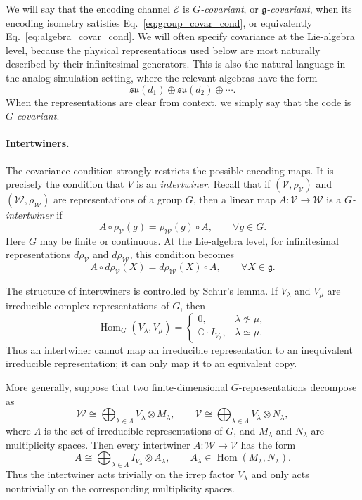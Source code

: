 \documentclass[10pt,twocolumn,superscriptaddress,aps,amsmath,amssymb,citeautoscript,floatfix,prx]{revtex4-2}
\newcounter{alg}
\theoremstyle{plain}
\theoremstyle{plain}
\theoremstyle{plain}
\theoremstyle{plain}
\theoremstyle{plain}
\theoremstyle{plain}
\begin{document}
We will say that the encoding channel $\mathcal E$ is \textit{$G$-covariant}, or \textit{$\mathfrak g$-covariant}, when its encoding isometry satisfies Eq.~\eqref{eq:group_covar_cond}, or equivalently Eq.~\eqref{eq:algebra_covar_cond}. We will often specify covariance at the Lie-algebra level, because the physical representations used below are most naturally described by their infinitesimal generators. This is also the natural language in the analog-simulation setting, where the relevant algebras have the form
$$
\mathfrak{su}(d_1)
\oplus
\mathfrak{su}(d_2)
\oplus
\cdots .
$$
When the representations are clear from context, we simply say that the code is \textit{$G$-covariant}.

\paragraph{Intertwiners.}

The covariance condition strongly restricts the possible encoding maps. It is precisely the condition that $V$ is an \textit{intertwiner}. Recall that if $(\mathcal V,\rho_{\mathcal V})$ and $(\mathcal W,\rho_{\mathcal W})$ are representations of a group $G$, then a linear map $A:\mathcal V\to\mathcal W$ is a \textit{$G$-intertwiner} if
\begin{equation}\label{eq:intertwiner_def}
A\circ\rho_{\mathcal V}(g)
=
\rho_{\mathcal W}(g)\circ A,
\qquad
\forall g\in G .
\end{equation}
Here $G$ may be finite or continuous. At the Lie-algebra level, for infinitesimal representations $d\rho_{\mathcal V}$ and $d\rho_{\mathcal W}$, this condition becomes
$$
A\circ d\rho_{\mathcal V}(X)
=
d\rho_{\mathcal W}(X)\circ A,
\qquad
\forall X\in\mathfrak g .
$$

The structure of intertwiners is controlled by Schur's lemma. If $V_\lambda$ and $V_\mu$ are irreducible complex representations of $G$, then
$$
\operatorname{Hom}_G(V_\lambda,V_\mu)
=
\begin{cases}
0, & \lambda\not\simeq\mu,\\
\mathbb C\cdot I_{V_\lambda}, & \lambda\simeq\mu .
\end{cases}
$$
Thus an intertwiner cannot map an irreducible representation to an inequivalent irreducible representation; it can only map it to an equivalent copy.

More generally, suppose that two finite-dimensional $G$-representations decompose as
$$
\mathcal W
\cong
\bigoplus_{\lambda\in\Lambda}
V_\lambda\otimes M_\lambda,
\qquad
\mathcal V
\cong
\bigoplus_{\lambda\in\Lambda}
V_\lambda\otimes N_\lambda,
$$
where $\Lambda$ is the set of irreducible representations of $G$, and $M_\lambda$ and $N_\lambda$ are multiplicity spaces. Then every intertwiner $A:\mathcal W\to\mathcal V$ has the form
\begin{equation}\label{eq:intertwiner_decomp}
A
\cong
\bigoplus_{\lambda\in\Lambda}
I_{V_\lambda}\otimes A_\lambda,
\qquad
A_\lambda\in\operatorname{Hom}(M_\lambda,N_\lambda).
\end{equation}
Thus the intertwiner acts trivially on the irrep factor $V_\lambda$ and only acts nontrivially on the corresponding multiplicity spaces.
\end{document}
